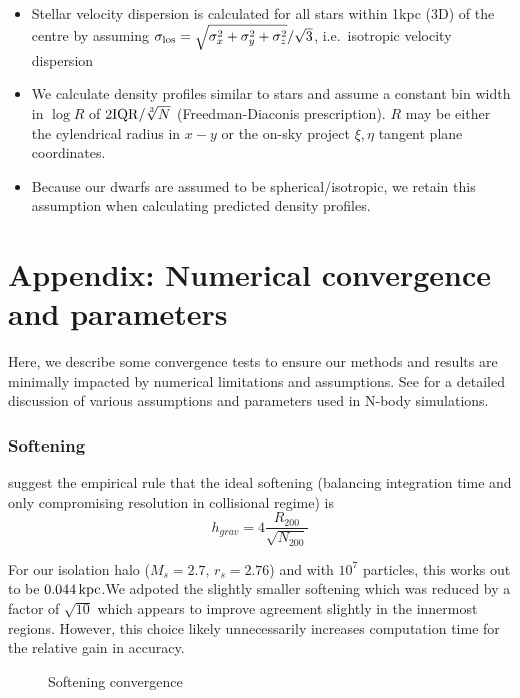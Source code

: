 \begin{itemize}
\tightlist
\item
  Stellar velocity dispersion is calculated for all stars within 1kpc
  (3D) of the centre by assuming
  \(\sigma_{\rm los} = \sqrt{\sigma_x^2 + \sigma_y^2 + \sigma_z^2}/ \sqrt 3\),
  i.e.~isotropic velocity dispersion
\item
  We calculate density profiles similar to stars and assume a constant
  bin width in \(\log R\) of \(2 {\rm IQR} / \sqrt[3]{N}\)
  (Freedman-Diaconis prescription). \(R\) may be either the cylendrical
  radius in \(x-y\) or the on-sky project \(\xi, \eta\) tangent plane
  coordinates.
\item
  Because our dwarfs are assumed to be spherical/isotropic, we retain
  this assumption when calculating predicted density profiles.
\end{itemize}

\section{Appendix: Numerical convergence and
parameters}\label{appendix-numerical-convergence-and-parameters}

Here, we describe some convergence tests to ensure our methods and
results are minimally impacted by numerical limitations and assumptions.
See \citet{power+2003} for a detailed discussion of various assumptions
and parameters used in N-body simulations.

\subsubsection{Softening}\label{softening}

\citet{power+2003} suggest the empirical rule that the ideal softening
(balancing integration time and only compromising resolution in
collisional regime) is \begin{equation}
h_{grav} = 4 \frac{R_{200}}{\sqrt{N_{200}}}
\end{equation}

For our isolation halo (\(M_s=2.7\), \(r_s=2.76\)) and with \(10^7\)
particles, this works out to be \(0.044\,{\rm kpc}\).We adpoted the
slightly smaller softening which was reduced by a factor of
\(\sqrt{10}\) which appears to improve agreement slightly in the
innermost regions. However, this choice likely unnecessarily increases
computation time for the relative gain in accuracy.

\begin{figure}
\centering
{}
\caption{Softening convergence}\label{fig:softening_convergence}
\end{figure}

